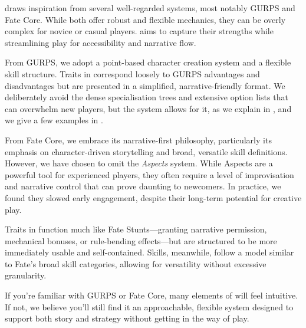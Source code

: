 \wyrd draws inspiration from several well-regarded systems, most notably GURPS and Fate Core. While both offer robust and flexible mechanics, they can be overly complex for novice or casual players. \wyrd aims to capture their strengths while streamlining play for accessibility and narrative flow.

From GURPS, we adopt a point-based character creation system and a flexible skill structure. Traits in \wyrd correspond loosely to GURPS advantages and disadvantages but are presented in a simplified, narrative-friendly format. We deliberately avoid the dense specialisation trees and extensive option lists that can overwhelm new players, but the system allows for it, as we explain in , and we give a few examples in .

From Fate Core, we embrace its narrative-first philosophy, particularly its emphasis on character-driven storytelling and broad, versatile skill definitions. However, we have chosen to omit the \emph{Aspects} system. While Aspects are a powerful tool for experienced players, they often require a level of improvisation and narrative control that can prove daunting to newcomers. In practice, we found they slowed early engagement, despite their long-term potential for creative play.

Traits in \wyrd function much like Fate Stunts—granting narrative permission, mechanical bonuses, or rule-bending effects—but are structured to be more immediately usable and self-contained. Skills, meanwhile, follow a model similar to Fate’s broad skill categories, allowing for versatility without excessive granularity.

If you're familiar with GURPS or Fate Core, many elements of \wyrd will feel intuitive. If not, we believe you’ll still find it an approachable, flexible system designed to support both story and strategy without getting in the way of play.


